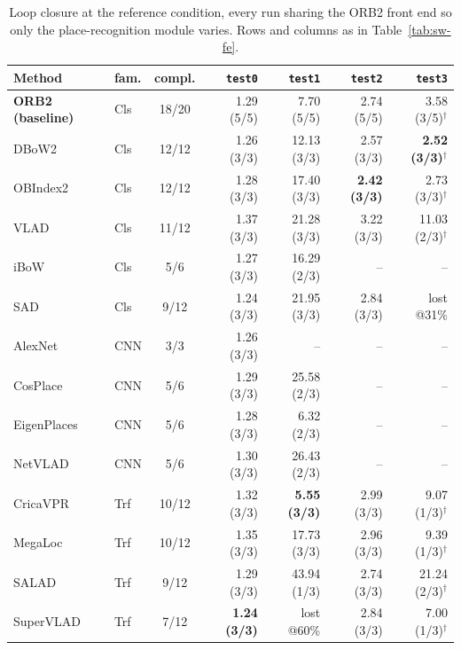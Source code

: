 \begin{table}[H]
\centering
\caption{Loop closure at the reference condition, every run sharing the ORB2 front end so only the place-recognition module varies. Rows and columns as in Table~\ref{tab:sw-fe}.}
\label{tab:sw-lc}
\footnotesize
\setlength{\tabcolsep}{4pt}
\begin{tabular}{@{}llcrrrr@{}}
\toprule
\textbf{Method} & \textbf{fam.} & \textbf{compl.} & \texttt{test0} & \texttt{test1} & \texttt{test2} & \texttt{test3} \\
\midrule
\textbf{ORB2 (baseline)} & Cls & 18/20 & 1.29 (5/5) & 7.70 (5/5) & 2.74 (5/5) & 3.58 (3/5)$^\dagger$ \\
DBoW2 & Cls & 12/12 & 1.26 (3/3) & 12.13 (3/3) & 2.57 (3/3) & \textbf{2.52 (3/3)$^\dagger$} \\
OBIndex2 & Cls & 12/12 & 1.28 (3/3) & 17.40 (3/3) & \textbf{2.42 (3/3)} & 2.73 (3/3)$^\dagger$ \\
VLAD & Cls & 11/12 & 1.37 (3/3) & 21.28 (3/3) & 3.22 (3/3) & 11.03 (2/3)$^\dagger$ \\
iBoW & Cls & 5/6 & 1.27 (3/3) & 16.29 (2/3) & -- & -- \\
SAD & Cls & 9/12 & 1.24 (3/3) & 21.95 (3/3) & 2.84 (3/3) & lost @31\% \\
AlexNet & CNN & 3/3 & 1.26 (3/3) & -- & -- & -- \\
CosPlace & CNN & 5/6 & 1.29 (3/3) & 25.58 (2/3) & -- & -- \\
EigenPlaces & CNN & 5/6 & 1.28 (3/3) & 6.32 (2/3) & -- & -- \\
NetVLAD & CNN & 5/6 & 1.30 (3/3) & 26.43 (2/3) & -- & -- \\
CricaVPR & Trf & 10/12 & 1.32 (3/3) & \textbf{5.55 (3/3)} & 2.99 (3/3) & 9.07 (1/3)$^\dagger$ \\
MegaLoc & Trf & 10/12 & 1.35 (3/3) & 17.73 (3/3) & 2.96 (3/3) & 9.39 (1/3)$^\dagger$ \\
SALAD & Trf & 9/12 & 1.29 (3/3) & 43.94 (1/3) & 2.74 (3/3) & 21.24 (2/3)$^\dagger$ \\
SuperVLAD & Trf & 7/12 & \textbf{1.24 (3/3)} & lost @60\% & 2.84 (3/3) & 7.00 (1/3)$^\dagger$ \\
\bottomrule
\end{tabular}
\end{table}
